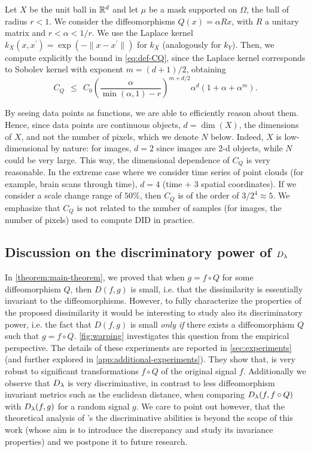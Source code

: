 \begin{example}\label{ex:diffeo}
Let $X$ be the unit ball in $\mathbb R^d$ and let $\mu$ be a mask supported on $\Omega$, the ball of radius $r < 1$. We consider the diffeomorphisms $Q(x) = \alpha R x$, with $R$ a unitary matrix and $r < \alpha < 1/r$. We use the Laplace kernel $k_X(x,x^\prime) = \exp(-\|x-x^\prime\|)$ for $k_X$ (analogously for $k_Y$).
Then, we compute explicitly the bound in \cref{eq:def-CQ}, since the Laplace kernel corresponds to Sobolev kernel with exponent $m = (d+1)/2$, obtaining
$$C_Q ~~\leq~~ C_0 \left(\frac{\alpha}{\min(\alpha,1) - r}\right)^{m+d/2}\alpha^d (1 + \alpha + \alpha^m).$$
\end{example}
\begin{remark}
By seeing data points as functions, we are able to efficiently reason about them. Hence, since data points are continuous objects, $d=\dim(X)$, the dimensions of $X$, and not the number of pixels, which we denote $N$ below. Indeed, $X$ is low-dimensional by nature: for images, $d=2$ since images are 2-d objects, while $N$ could be very large. This way, the dimensional dependence of $C_Q$ is very reasonable. In the extreme case where we consider time series of point clouds (for example, brain scans through time), $d = 4$ (time $+$ 3 spatial coordinates). If we consider a scale change range of $50\%$, then $C_Q$ is of the order of $3/2^4 \approx 5$. We emphasize that $C_Q$ is not related to the number of samples (for images, the number of pixels) used to compute DID in practice.
\end{remark}
\subsection{Discussion on the discriminatory power of $D_\lambda$} \label{sec:discussion-selectivity}
In \cref{theorem:main-theorem}, we proved that when $g = f \circ Q$ for some diffeomorphism $Q$, then $D(f,g)$ is small, i.e. that the dissimilarity is essentially invariant to the diffeomorphisms. However, to fully characterize the properties of the proposed dissimilarity it would be interesting to study also its discriminatory power, i.e. the fact that $D(f,g)$ is small {\em only if} there exists a diffeomorphism $Q$ such that $g = f \circ Q$. \cref{fig:warping} investigates this question from the empirical perspective. The details of these experiments are reported in \cref{sec:experiments} (and further explored in \cref{app:additional-experiments}). They show that, \Diffy is very robust to significant transformations $f\circ Q$ of the original signal $f$. Additionally we observe that $D_\lambda$ is very discriminative, in contrast to less diffeomorphism invariant metrics such as the euclidean distance, when comparing $D_\lambda(f,f\circ Q)$ with $D_\lambda(f,g)$ for a random signal $g$. We care to point out however, that the theoretical analysis of \Diffy's the discriminative abilities is beyond the scope of this work (whose aim is to introduce the discrepancy and study its invariance properties) and we postpone it to future research.

